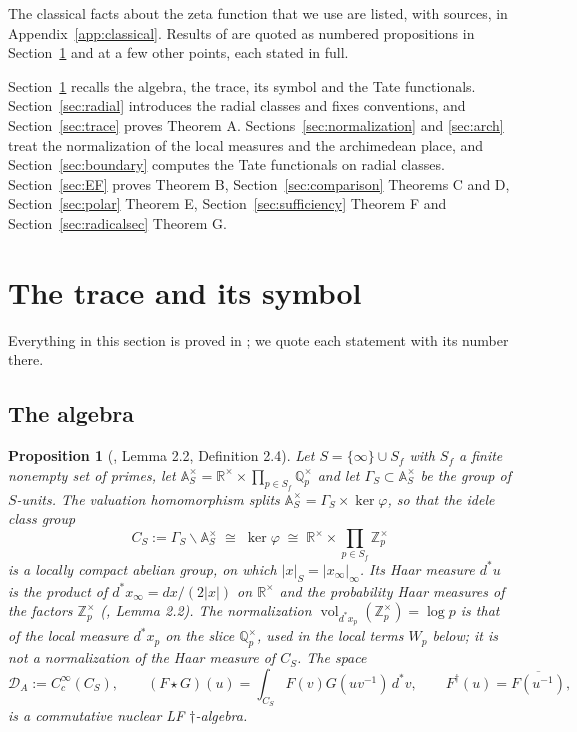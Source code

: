 \documentclass[11pt]{amsart}
\newtheorem{proposition}[theorem]{Proposition}
\theoremstyle{definition}
\theoremstyle{remark}
\newcommand{\R}{\mathbb R}
\newcommand{\Z}{\mathbb Z}
\newcommand{\Q}{\mathbb Q}
\newcommand{\A}{\mathbb A}
\newcommand{\vol}{\operatorname{vol}}
\newcommand{\DA}{\mathcal D_A}
\newcommand{\CS}{C_S}
\begin{document}
The classical facts about the zeta function that we use are listed, with
sources, in Appendix~\ref{app:classical}.  Results of \cite{P43,P44} are
quoted as numbered propositions in Section~\ref{sec:carrier} and at a few
other points, each stated in full.

Section~\ref{sec:carrier} recalls the algebra, the trace, its symbol and the
Tate functionals.  Section~\ref{sec:radial} introduces the radial classes and
fixes conventions, and Section~\ref{sec:trace} proves Theorem A.
Sections~\ref{sec:normalization} and \ref{sec:arch} treat the normalization
of the local measures and the archimedean place, and
Section~\ref{sec:boundary} computes the Tate functionals on radial classes.
Section~\ref{sec:EF} proves Theorem B, Section~\ref{sec:comparison} Theorems C
and D, Section~\ref{sec:polar} Theorem E, Section~\ref{sec:sufficiency}
Theorem F and Section~\ref{sec:radicalsec} Theorem G.

\section{The trace and its symbol}
\label{sec:carrier}

Everything in this section is proved in \cite{P43}; we quote each statement
with its number there.

\subsection{The algebra}

\begin{proposition}[\cite{P43}, Lemma 2.2, Definition 2.4]
\label{prop:carrier}
Let $S=\{\infty\}\cup S_f$ with $S_f$ a finite nonempty set of primes, let
$\A_S^\times=\R^\times\times\prod_{p\in S_f}\Q_p^\times$ and let
$\Gamma_S\subset\A_S^\times$ be the group of $S$-units.  The valuation
homomorphism splits $\A_S^\times=\Gamma_S\times\ker\varphi$, so that the idele
class group
\[
  \CS:=\Gamma_S\backslash\A_S^\times\;\cong\;\ker\varphi\;\cong\;
  \R^\times\times\prod_{p\in S_f}\Z_p^\times
  \tag{2.1}
\]
is a locally compact abelian group, on which $|x|_S=|x_\infty|_\infty$.  Its
Haar measure $d^*u$ is the product of $d^*x_\infty=dx/(2|x|)$ on $\R^\times$
and the \emph{probability} Haar measures of the factors $\Z_p^\times$
(\cite{P43}, Lemma 2.2).  The normalization $\vol_{d^*x_p}(\Z_p^\times)=\log p$
is that of the \emph{local} measure $d^*x_p$ on the slice $\Q_p^\times$,
used in the local terms $W_p$ below; it is not a normalization of the Haar
measure of $\CS$.  The space
\[
  \DA:=C_c^\infty(\CS),\qquad
  (F\star G)(u)=\int_{\CS}F(v)G(uv^{-1})\,d^*v,\qquad
  F^\dagger(u)=\overline{F(u^{-1})},
  \tag{2.2}
\]
is a commutative nuclear LF $\dagger$-algebra.
\end{proposition}
\end{document}
